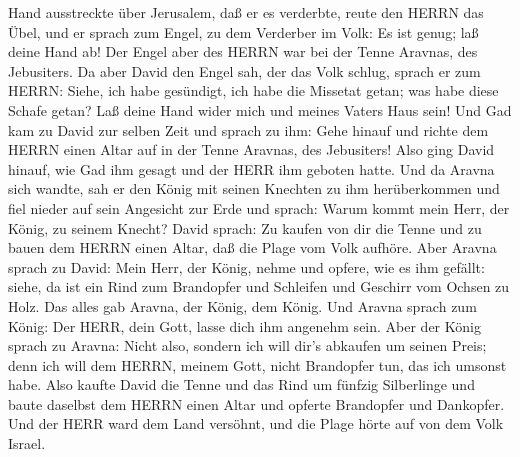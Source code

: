 Hand ausstreckte über Jerusalem, daß er es verderbte, reute den HERRN
das Übel, und er sprach zum Engel, zu dem Verderber im Volk: Es ist
genug; laß deine Hand ab! Der Engel aber des HERRN war bei der Tenne
Aravnas, des Jebusiters.  Da aber David den Engel sah, der
das Volk schlug, sprach er zum HERRN: Siehe, ich habe gesündigt, ich
habe die Missetat getan; was habe diese Schafe getan? Laß deine Hand
wider mich und meines Vaters Haus sein!  Und Gad kam zu
David zur selben Zeit und sprach zu ihm: Gehe hinauf und richte dem
HERRN einen Altar auf in der Tenne Aravnas, des Jebusiters!
 Also ging David hinauf, wie Gad ihm gesagt und der HERR
ihm geboten hatte.  Und da Aravna sich wandte, sah er den
König mit seinen Knechten zu ihm herüberkommen und fiel nieder auf sein
Angesicht zur Erde  und sprach: Warum kommt mein Herr, der
König, zu seinem Knecht? David sprach: Zu kaufen von dir die Tenne und
zu bauen dem HERRN einen Altar, daß die Plage vom Volk aufhöre.
 Aber Aravna sprach zu David: Mein Herr, der König, nehme
und opfere, wie es ihm gefällt: siehe, da ist ein Rind zum Brandopfer
und Schleifen und Geschirr vom Ochsen zu Holz.  Das alles
gab Aravna, der König, dem König. Und Aravna sprach zum König: Der HERR,
dein Gott, lasse dich ihm angenehm sein.  Aber der König
sprach zu Aravna: Nicht also, sondern ich will dir's abkaufen um seinen
Preis; denn ich will dem HERRN, meinem Gott, nicht Brandopfer tun, das
ich umsonst habe. Also kaufte David die Tenne und das Rind um fünfzig
Silberlinge  und baute daselbst dem HERRN einen Altar und
opferte Brandopfer und Dankopfer. Und der HERR ward dem Land versöhnt,
und die Plage hörte auf von dem Volk Israel.
